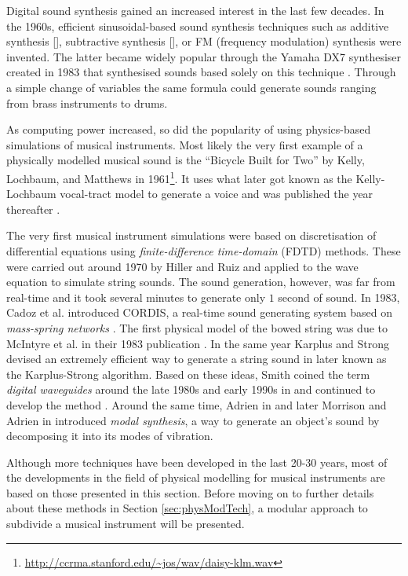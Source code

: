 Digital sound synthesis gained an increased interest in the last few decades. In the 1960s, efficient sinusoidal-based sound synthesis techniques such as additive synthesis [\SWcomment[stefania? :)]], subtractive synthesis [\SWcomment[stefania? :)]], or FM (frequency modulation) synthesis \cite{Chowning1973} were invented. The latter became widely popular through the Yamaha DX7 synthesiser created in 1983 that synthesised sounds based solely on this technique \cite{DX7}. Through a simple change of variables the same formula could generate sounds ranging from brass instruments to drums. 
 
As computing power increased, so did the popularity of using physics-based simulations of musical instruments. Most likely the very first example of a physically modelled musical sound is the ``Bicycle Built for Two'' by Kelly, Lochbaum, and Matthews in 1961\footnote{\url{http://ccrma.stanford.edu/~jos/wav/daisy-klm.wav}}. It uses what later got known as the Kelly-Lochbaum vocal-tract model to generate a voice and was published the year thereafter \cite{Kelly1962}. 

The very first musical instrument simulations were based on discretisation of differential equations using \textit{finite-difference time-domain} (FDTD) methods. These were carried out around 1970 by Hiller and Ruiz \cite{Ruiz1969, Hiller1971I, Hiller1971II} and applied to the wave equation to simulate string sounds. The sound generation, however, was far from real-time and it took several minutes to generate only $1$ second of sound. In 1983, Cadoz et al. introduced CORDIS, a real-time sound generating system based on \textit{mass-spring networks} \cite{Cadoz1983}.
The first physical model of the bowed string was due to McIntyre et al. in their 1983 publication \cite{McIntyre1983}. In the same year Karplus and Strong devised an extremely efficient way to generate a string sound in \cite{Karplus1983} later known as the Karplus-Strong algorithm. Based on these ideas, Smith coined the term \textit{digital waveguides} around the late 1980s and early 1990s in \cite{Smith1987, Smith1992} and continued to develop the method \cite{Smith2010b}.
Around the same time, Adrien in \cite{Adrien1991} and later Morrison and Adrien in \cite{Morrison1993} introduced \textit{modal synthesis}, a way to generate an object's sound by decomposing it into its modes of vibration. 

Although more techniques have been developed in the last 20-30 years, most of the developments in the field of physical modelling for musical instruments are based on those presented in this section. Before moving on to further details about these methods in Section \ref{sec:physModTech}, a modular approach to subdivide a musical instrument will be presented.

